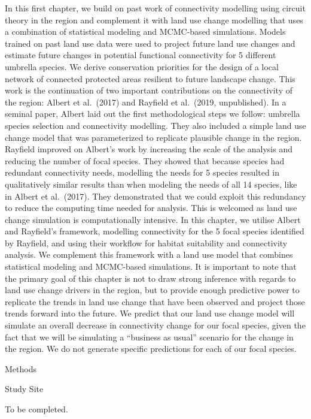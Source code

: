 \documentclass[]{article}
\begin{document}
In this first chapter, we build on past work of connectivity modelling
using circuit theory in the region and complement it with land use
change modelling that uses a combination of statistical modeling and
MCMC-based simulations. Models trained on past land use data were used
to project future land use changes and estimate future changes in
potential functional connectivity for 5 different umbrella species. We
derive conservation priorities for the design of a local network of
connected protected areas resilient to future landscape change. This
work is the continuation of two important contributions on the
connectivity of the region: Albert et al.~(2017) and Rayfield et
al.~(2019, unpublished). In a seminal paper, Albert laid out the first
methodological steps we follow: umbrella species selection and
connectivity modelling. They also included a simple land use change
model that was parameterized to replicate plausible change in the
region. Rayfield improved on Albert's work by increasing the scale of
the analysis and reducing the number of focal species. They showed that
because species had redundant connectivity needs, modelling the needs
for 5 species resulted in qualitatively similar results than when
modeling the needs of all 14 species, like in Albert et al.~(2017). They
demonstrated that we could exploit this redundancy to reduce the
computing time needed for analysis. This is welcomed as land use change
simulation is computationally intensive. In this chapter, we utilise
Albert and Rayfield's framework, modelling connectivity for the 5 focal
species identified by Rayfield, and using their workflow for habitat
suitability and connectivity analysis. We complement this framework with
a land use model that combines statistical modeling and MCMC-based
simulations. It is important to note that the primary goal of this
chapter is not to draw strong inference with regards to land use change
drivers in the region, but to provide enough predictive power to
replicate the trends in land use change that have been observed and
project those trends forward into the future. We predict that our land
use change model will simulate an overall decrease in connectivity
change for our focal species, given the fact that we will be simulating
a ``business as usual'' scenario for the change in the region. We do not
generate specific predictions for each of our focal species.

Methods

Study Site

To be completed.
\end{document}
